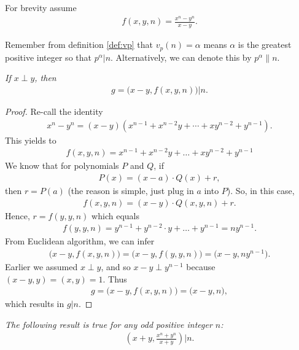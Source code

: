 \documentclass[main.tex]{subfile}
\begin{document}
	For brevity assume
	\begin{align*}
		f(x,y,n)=\frac{x^n-y^n}{x-y}.
	\end{align*}

	Remember from definition \eqref{def:vp} that $v_{p}(n)=\alpha$ means $\alpha$ is the greatest positive integer so that $p^\alpha|n$. Alternatively, we can denote this by $p^\alpha\|n$.

	\begin{theorem}\slshape\label{thm:egl}
		If $x\perp y$, then
			\begin{align*}
				g=\big(x-y,f(x,y,n)\big)\big|n.
			\end{align*}
	\end{theorem}

	\begin{proof}
		Re-call the identity
			\begin{align*}
				x^n-y^n=(x-y)\left(x^{n-1}+x^{n-2}y+\cdots+xy^{n-2}+y^{n-1}\right).
			\end{align*}
		This yields to
			\begin{align*}
				f(x,y,n)=x^{n-1}+x^{n-2}y+\ldots+xy^{n-2}+y^{n-1}
			\end{align*}
		We know that for polynomials $P$ and $Q$, if
			\begin{align*}
				P(x)=(x-a)\cdot Q(x)+r,
			\end{align*}
		then $r=P(a)$ (the reason is simple, just plug in $a$ into $P$). So, in this case,
			\begin{align*}
				f(x,y,n)=(x-y)\cdot Q(x,y,n)+r.
			\end{align*}
		Hence, $r=f(y,y,n)$ which equals
		\begin{align*}
			f(y,y,n)=y^{n-1}+y^{n-2}\cdot y+\ldots+y^{n-1}=ny^{n-1}.
		\end{align*}
		From Euclidean algorithm, we can infer
		\begin{align*}
			\big(x-y,f(x,y,n)\big)=\big(x-y,f(y,y,n)\big)=\big(x-y,ny^{n-1}\big).
		\end{align*}
		Earlier we assumed $x\perp y$, and so $x-y\perp y^{n-1}$ because $(x-y,y)=(x,y)=1$. Thus
		\begin{align*}
			g=\big(x-y,f(x,y,n)\big)=\big(x-y,n\big),
		\end{align*}
		which results in $g|n$.
	\end{proof}

	\begin{corollary}\slshape
		The following result is true for any odd positive integer $n$:
		\begin{align*}
			\left(x+y,\frac{x^n+y^n}{x+y}\right)\Big|n.
		\end{align*}
	\end{corollary}
\end{document}
